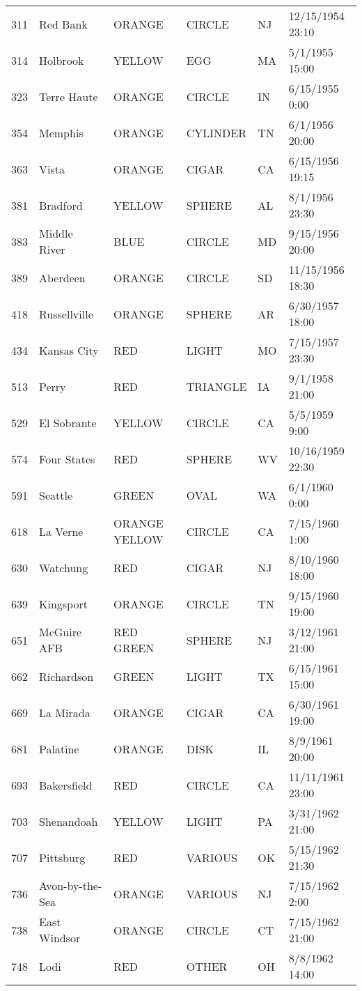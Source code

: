 \begin{tabular}{llllll}
311 & Red Bank & ORANGE & CIRCLE & NJ & 12/15/1954 23:10 \\
314 & Holbrook & YELLOW & EGG & MA & 5/1/1955 15:00 \\
323 & Terre Haute & ORANGE & CIRCLE & IN & 6/15/1955 0:00 \\
354 & Memphis & ORANGE & CYLINDER & TN & 6/1/1956 20:00 \\
363 & Vista & ORANGE & CIGAR & CA & 6/15/1956 19:15 \\
381 & Bradford & YELLOW & SPHERE & AL & 8/1/1956 23:30 \\
383 & Middle River & BLUE & CIRCLE & MD & 9/15/1956 20:00 \\
389 & Aberdeen & ORANGE & CIRCLE & SD & 11/15/1956 18:30 \\
418 & Russellville & ORANGE & SPHERE & AR & 6/30/1957 18:00 \\
434 & Kansas City & RED & LIGHT & MO & 7/15/1957 23:30 \\
513 & Perry & RED & TRIANGLE & IA & 9/1/1958 21:00 \\
529 & El Sobrante & YELLOW & CIRCLE & CA & 5/5/1959 9:00 \\
574 & Four States & RED & SPHERE & WV & 10/16/1959 22:30 \\
591 & Seattle & GREEN & OVAL & WA & 6/1/1960 0:00 \\
618 & La Verne & ORANGE YELLOW & CIRCLE & CA & 7/15/1960 1:00 \\
630 & Watchung & RED & CIGAR & NJ & 8/10/1960 18:00 \\
639 & Kingsport & ORANGE & CIRCLE & TN & 9/15/1960 19:00 \\
651 & McGuire AFB & RED GREEN & SPHERE & NJ & 3/12/1961 21:00 \\
662 & Richardson & GREEN & LIGHT & TX & 6/15/1961 15:00 \\
669 & La Mirada & ORANGE & CIGAR & CA & 6/30/1961 19:00 \\
681 & Palatine & ORANGE & DISK & IL & 8/9/1961 20:00 \\
693 & Bakersfield & RED & CIRCLE & CA & 11/11/1961 23:00 \\
703 & Shenandoah & YELLOW & LIGHT & PA & 3/31/1962 21:00 \\
707 & Pittsburg & RED & VARIOUS & OK & 5/15/1962 21:30 \\
736 & Avon-by-the-Sea & ORANGE & VARIOUS & NJ & 7/15/1962 2:00 \\
738 & East Windsor & ORANGE & CIRCLE & CT & 7/15/1962 21:00 \\
748 & Lodi & RED & OTHER & OH & 8/8/1962 14:00 \\

\end{tabular}
